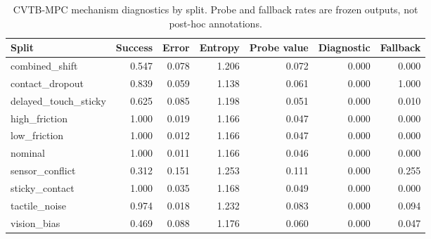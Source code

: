 \begin{table}[t]
\centering
\caption{CVTB-MPC mechanism diagnostics by split. Probe and fallback rates are frozen outputs, not post-hoc annotations.}
\label{tab:diagnostics}
\scriptsize
\begin{tabular}{lrrrrrr}
\toprule
Split & Success & Error & Entropy & Probe value & Diagnostic & Fallback \\
\midrule
combined\_shift & 0.547 & 0.078 & 1.206 & 0.072 & 0.000 & 0.000 \\
contact\_dropout & 0.839 & 0.059 & 1.138 & 0.061 & 0.000 & 1.000 \\
delayed\_touch\_sticky & 0.625 & 0.085 & 1.198 & 0.051 & 0.000 & 0.010 \\
high\_friction & 1.000 & 0.019 & 1.166 & 0.047 & 0.000 & 0.000 \\
low\_friction & 1.000 & 0.012 & 1.166 & 0.047 & 0.000 & 0.000 \\
nominal & 1.000 & 0.011 & 1.166 & 0.046 & 0.000 & 0.000 \\
sensor\_conflict & 0.312 & 0.151 & 1.253 & 0.111 & 0.000 & 0.255 \\
sticky\_contact & 1.000 & 0.035 & 1.168 & 0.049 & 0.000 & 0.000 \\
tactile\_noise & 0.974 & 0.018 & 1.232 & 0.083 & 0.000 & 0.094 \\
vision\_bias & 0.469 & 0.088 & 1.176 & 0.060 & 0.000 & 0.047 \\
\bottomrule
\end{tabular}
\end{table}
